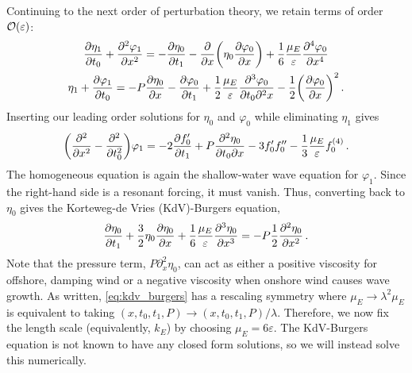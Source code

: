 \documentclass{jfm}
\renewcommand*{\epsilon}{\varepsilon}
\begin{document}
Continuing to the next order of perturbation theory, we retain terms of
order $\order{\epsilon}$:
\begin{gather}
    \pdv{\eta_1}{t_0} + \pdv[2]{\varphi_{1}}{x} =
      -\pdv{\eta_0}{t_1} - \pdv{x} \pqty{\eta_0 \pdv{\varphi_0}{x}} +
      \frac{1}{6} \frac{\mu_E}{\epsilon} \pdv[4]{\varphi_0}{x}
  \\
    \eta_1 + \pdv{\varphi_1}{t_0} = -P \pdv{\eta_0}{x} -\pdv{\varphi_0}{t_1}
      + \frac{1}{2} \frac{\mu_E}{\epsilon} \frac{\partial^3 \varphi_0}
        {\partial t_0 \partial^2 x}
      - \frac{1}{2} \pqty{ \pdv{\varphi_0}{x} }^2
  \,.
\end{gather}
Inserting our leading order solutions for $\eta_0$ and $\varphi_0$ while
eliminating $\eta_1$ gives
\begin{equation}
  \pqty{\pdv[2]{x} - \pdv[2]{t_0}} \varphi_1 = -2 \pdv{f_0'}{t_1} +
    P\pdv{\eta_0}{t_0}{x} - 3 f_0' f_0'' - \frac{1}{3} \frac{\mu_E}{\epsilon}
    f_0^{(4)} \,.
\end{equation}
The homogeneous equation is again the shallow-water wave equation for
$\varphi_1$.
Since the right-hand side is a resonant forcing, it must vanish.
Thus, converting back to $\eta_0$ gives the Korteweg-de Vries
(KdV)-Burgers equation,
\begin{equation}
  \pdv{\eta_0}{t_1} + \frac{3}{2}
    \eta_0 \pdv{\eta_0}{x} + \frac{1}{6} \frac{\mu_E}{\epsilon}
    \pdv[3]{\eta_0}{x} = -P \frac{1}{2} \pdv[2]{\eta_0}{x} \,.
  \label{eq:kdv_burgers}
\end{equation}
Note that the pressure term, $P \partial^2_x \eta_0$, can act as either
a positive viscosity for offshore, damping wind or a negative viscosity
when onshore wind causes wave growth.
As written, \cref{eq:kdv_burgers} has a rescaling symmetry where $\mu_E
\to \lambda^2 \mu_E$ is equivalent to taking $(x,t_0,t_1,P) \to
(x,t_0,t_1,P)/\lambda$.
Therefore, we now fix the length scale (equivalently, $k_E$) by choosing
$\mu_E = 6 \epsilon$.
The KdV-Burgers equation is not known to have any closed form solutions,
so we will instead solve this numerically.
\end{document}
